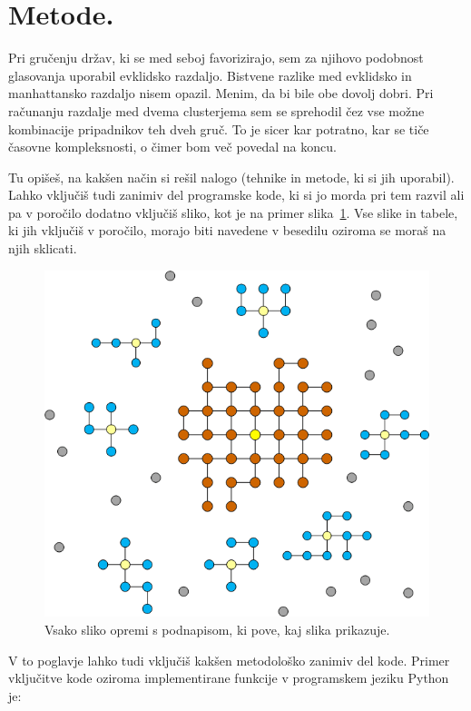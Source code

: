 \documentclass[a4paper,11pt]{article}
\begin{document}
\section{Metode.}
Pri gručenju držav, ki se med seboj favorizirajo, sem za njihovo podobnost glasovanja uporabil evklidsko razdaljo.
Bistvene razlike med evklidsko in manhattansko razdaljo nisem opazil. Menim, da bi bile obe dovolj dobri.
Pri računanju razdalje med dvema clusterjema sem se sprehodil čez vse možne kombinacije pripadnikov teh dveh gruč.
To je sicer kar potratno, kar se tiče časovne kompleksnosti, o čimer bom več povedal na koncu.

Tu opišeš, na kakšen način si rešil nalogo (tehnike in metode, ki si
jih uporabil). Lahko vključiš tudi zanimiv del programske kode, ki
si jo morda pri tem razvil ali pa v poročilo dodatno vključiš sliko,
kot je na primer slika~\ref{slika1}. Vse slike in tabele, ki jih
vključiš v poročilo, morajo biti navedene v besedilu oziroma se moraš
na njih sklicati.

\begin{figure}[htbp]
\begin{center}
\includegraphics[scale=0.3]{slika-primer.png}
\caption{Vsako sliko opremi s podnapisom, ki pove, kaj slika prikazuje.}
\label{slika1}
\end{center}
\end{figure}

V to poglavje lahko tudi vključiš kakšen metodološko zanimiv del
kode. Primer vključitve kode oziroma implementirane funkcije v
programskem jeziku Python je:
\end{document}
